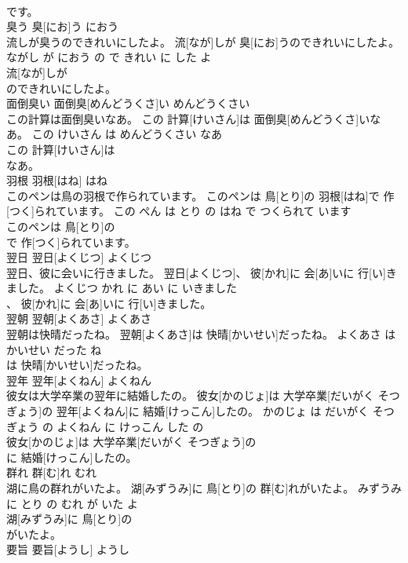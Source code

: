 \documentclass[8pt]{extreport}
\begin{document}
\begin{CJK}{UTF8}{min}
\\	です。			
\\	臭う	臭[にお]う	におう	
\\	流しが臭うのできれいにしたよ。	流[なが]しが 臭[にお]うのできれいにしたよ。	ながし が におう の で きれい に した よ	
\\	流[なが]しが
\\	のできれいにしたよ。			
\\	面倒臭い	面倒臭[めんどうくさ]い	めんどうくさい	
\\	この計算は面倒臭いなあ。	この 計算[けいさん]は 面倒臭[めんどうくさ]いなあ。	この けいさん は めんどうくさい なあ	
\\	この 計算[けいさん]は
\\	なあ。			
\\	羽根	羽根[はね]	はね	
\\	このペンは鳥の羽根で作られています。	このペンは 鳥[とり]の 羽根[はね]で 作[つく]られています。	この ぺん は とり の はね で つくられて います	
\\	このペンは 鳥[とり]の
\\	で 作[つく]られています。			
\\	翌日	翌日[よくじつ]	よくじつ	
\\	翌日、彼に会いに行きました。	翌日[よくじつ]、 彼[かれ]に 会[あ]いに 行[い]きました。	よくじつ かれ に あい に いきました	
\\	、 彼[かれ]に 会[あ]いに 行[い]きました。			
\\	翌朝	翌朝[よくあさ]	よくあさ	
\\	翌朝は快晴だったね。	翌朝[よくあさ]は 快晴[かいせい]だったね。	よくあさ は かいせい だった ね	
\\	は 快晴[かいせい]だったね。			
\\	翌年	翌年[よくねん]	よくねん	
\\	彼女は大学卒業の翌年に結婚したの。	彼女[かのじょ]は 大学卒業[だいがく そつぎょう]の 翌年[よくねん]に 結婚[けっこん]したの。	かのじょ は だいがく そつぎょう の よくねん に けっこん した の	
\\	彼女[かのじょ]は 大学卒業[だいがく そつぎょう]の
\\	に 結婚[けっこん]したの。			
\\	群れ	群[む]れ	むれ	
\\	湖に鳥の群れがいたよ。	湖[みずうみ]に 鳥[とり]の 群[む]れがいたよ。	みずうみ に とり の むれ が いた よ	
\\	湖[みずうみ]に 鳥[とり]の
\\	がいたよ。			
\\	要旨	要旨[ようし]	ようし	

\end{CJK}
\end{document}
